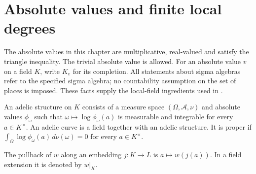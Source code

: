 \section{Absolute values and finite local degrees}

The absolute values in this chapter are multiplicative, real-valued and
satisfy the triangle inequality. The trivial absolute value is allowed.
For an absolute value $v$ on a field $K$, write $K_v$ for its completion.
All statements about sigma algebras refer to the specified sigma algebra;
no countability assumption on the set of places is imposed.
These facts supply the local-field ingredients used in
\cite[\S\S3.3--3.4]{chen-moriwaki}.

\begin{definition}\label{def:adelic-structure}
\leanok
{}
An adelic structure on $K$ consists of a measure space
$(\Omega,\mathcal A,\nu)$ and absolute values $\phi_\omega$ such that
$\omega\mapsto\log\phi_\omega(a)$ is measurable and integrable for every
$a\in K^\times$. An adelic curve is a field together with an adelic
structure. It is proper if
$\int_\Omega\log\phi_\omega(a)\,d\nu(\omega)=0$ for every $a\in K^\times$.
\end{definition}

\begin{definition}\label{def:absolute-value-restriction}
\leanok
{}
The pullback of $w$ along an embedding $j:K\to L$ is $a\mapsto w(j(a))$.
In a field extension it is denoted by $w|_K$.
\end{definition}

